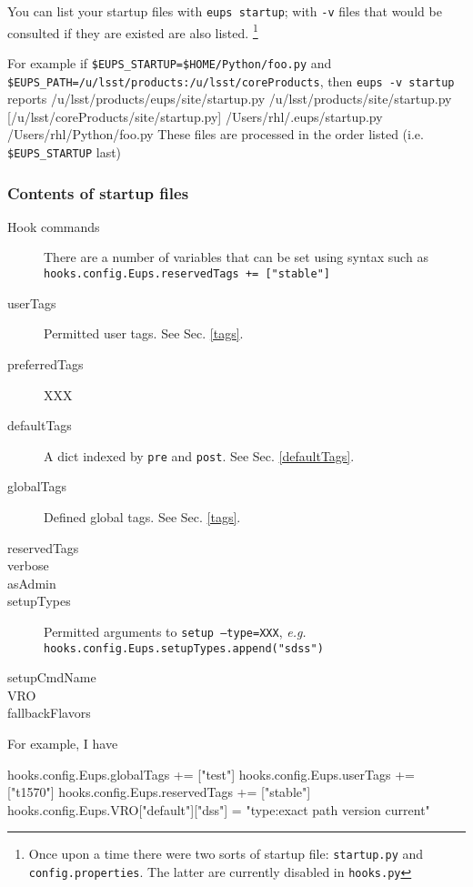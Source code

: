 \documentclass{article}
\newcommand{\code}[1]{\texttt{#1}}
\newcommand{\file}[1]{\texttt{#1}}
\let\overbatim=\verbatim
\let\oendverbatim=\endverbatim
\renewenvironment{verbatim}
{\center\minipage{16cm}\overbatim}
{\oendverbatim\endminipage\endcenter}
\begin{document}
You can list your startup files with \code{eups startup}; with \code{-v} files that would be consulted if they
are existed are also listed.  \footnote{Once upon a time there were two sorts of startup file: \file{startup.py} and \file{config.properties}.  The latter are currently disabled in \file{hooks.py}}

For example if \code{\$EUPS\_STARTUP=\$HOME/Python/foo.py} and \code{\$EUPS\_PATH=/u/lsst/products:/u/lsst/coreProducts}, then \code{eups -v startup} reports
\begin{verbatim}
/u/lsst/products/eups/site/startup.py
/u/lsst/products/site/startup.py
[/u/lsst/coreProducts/site/startup.py]
/Users/rhl/.eups/startup.py
/Users/rhl/Python/foo.py
\end{verbatim}
These files are processed in the order listed (i.e. \code{\$EUPS\_STARTUP} last)

\subsubsection{Contents of startup files}
\label{secStartupFiles}

\begin{description}
  \item[Hook commands]
    There are a number of variables that can be set using syntax such as\hfil\break
    \code{hooks.config.Eups.reservedTags += ["stable"]}

    \item[userTags]
      Permitted user tags.  See Sec. \ref{tags}.
    \item[preferredTags]
      XXX
    \item[defaultTags]
      A dict indexed by \code{pre} and \code{post}.  See Sec. \ref{defaultTags}.
    \item[globalTags]
      Defined global tags.  See Sec. \ref{tags}.
    \item[reservedTags]
    \item[verbose]
    \item[asAdmin]
    \item[setupTypes]
      Permitted arguments to \code{setup --type=XXX}, \textit{e.g.}
      \code{hooks.config.Eups.setupTypes.append("sdss")}
    \item[setupCmdName]
    \item[VRO]
    \item[fallbackFlavors]
\end{description}

For example, I have
\begin{verbatim}

hooks.config.Eups.globalTags += ["test"]
hooks.config.Eups.userTags += ["t1570"]
hooks.config.Eups.reservedTags += ["stable"]
hooks.config.Eups.VRO["default"]["dss"] = "type:exact path version current"
\end{verbatim}
\end{document}
